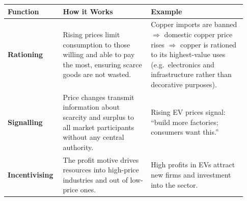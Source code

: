 \documentclass[11pt, a4paper, twoside]{book}
\begin{document}
\begin{tcolorbox}[enhanced,colback=LightBlue,colframe=MidBlue!70,arc=0pt,boxrule=0.8pt,
  left=10pt,right=10pt,top=8pt,bottom=8pt]
\begin{tabular}{@{}>{\RaggedRight\arraybackslash}p{0.20\linewidth}>{\RaggedRight\arraybackslash}p{0.35\linewidth}>{\RaggedRight\arraybackslash}p{0.38\linewidth}@{}}
\textbf{\color{NavyPrimary}Function} & \textbf{\color{NavyPrimary}How it Works} & \textbf{\color{NavyPrimary}Example} \\
\midrule
\textbf{Rationing} & Rising prices limit consumption to those willing and able to pay the most, ensuring scarce goods are not wasted. & Copper imports are banned $\Rightarrow$ domestic copper price rises $\Rightarrow$ copper is rationed to its highest-value uses (e.g.\ electronics and infrastructure rather than decorative purposes). \\
\textbf{Signalling} & Price changes transmit information about scarcity and surplus to all market participants without any central authority. & Rising EV prices signal: ``build more factories; consumers want this.'' \\
\textbf{Incentivising} & The profit motive drives resources into high-price industries and out of low-price ones. & High profits in EVs attract new firms and investment into the sector. \\
\end{tabular}
\end{tcolorbox}
\end{document}
